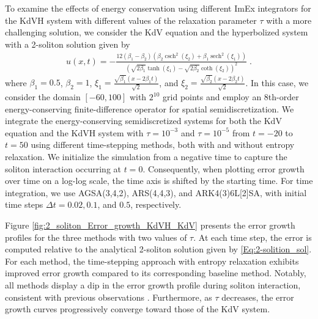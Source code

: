 \documentclass{article}
\DeclareMathOperator{\sech}{sech}
\DeclareMathOperator{\csch}{csch}
\begin{document}
To examine the effects of energy conservation using different ImEx integrators for the KdVH system with different values
of the relaxation parameter $\tau$ with a more challenging solution, we consider the KdV equation and the hyperbolized system with
a 2-soliton solution given by
\begin{align}\label{Eq:2-solition_sol}
    u(x, t) = -\frac{12(\beta_1-\beta_2)\left(\beta_2 \csch^2(\xi_2)+\beta_1 \sech^2(\xi_1)\right)}
    {\left(\sqrt{2 \beta_1} \tanh(\xi_1)-\sqrt{2 \beta_2} \coth(\xi_2)\right)^2} \;.
\end{align}
where $\beta_1 = 0.5$, $\beta_2 = 1$, $\xi_1 = \frac{\sqrt{\beta_1}(x-2 \beta_1 t)}{\sqrt{2}}$, and $\xi_2 = \frac{\sqrt{\beta_2}(x-2 \beta_2 t)}{\sqrt{2}}$.
In this case, we consider the domain $[-60, 100]$ with $2^{10}$ grid points and employ an 8th-order energy-conserving finite-difference
operator for spatial semidiscretization. We integrate the energy-conserving semidiscretized systems for both the KdV
equation and the KdVH system with $\tau = 10^{-3}$ and $\tau = 10^{-5}$ from $t = -20$ to $t = 50$ using different
time-stepping methods, both with and without entropy relaxation. We initialize the simulation from a negative
time to capture the soliton interaction occurring at $t = 0$. Consequently, when plotting error growth over time on a
log-log scale, the time axis is shifted by the starting time. For time integration, we use AGSA(3,4,2), ARS(4,4,3),
and ARK4(3)6L[2]SA, with initial time steps $\Delta t = 0.02, 0.1$, and $0.5$, respectively.

Figure \ref{fig:2_soliton_Error_growth_KdVH_KdV} presents the error growth profiles for the three methods with two
values of $\tau$. At each time step, the error is computed relative to the analytical 2-soliton solution given
by \eqref{Eq:2-solition_sol}. For each method, the time-stepping approach with entropy relaxation exhibits improved
error growth compared to its corresponding baseline method. Notably, all methods display a dip in the error growth
profile during soliton interaction, consistent with previous observations \cite{biswas2023multiple,frutos1997accuracy}.
Furthermore, as $\tau$ decreases, the error growth curves progressively converge toward those of the KdV system.
\end{document}
